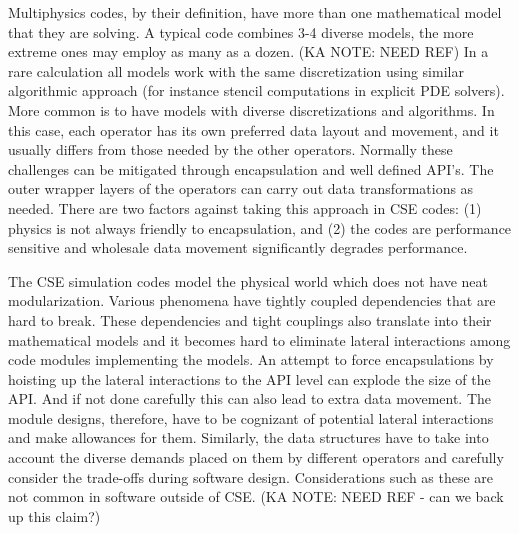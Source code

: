 \label{sec:domainChallenges}
Multiphysics codes, by their definition, have more than one
mathematical model that they are solving. A typical code combines 3-4
diverse models, the more extreme ones may employ as many as a
dozen. (KA NOTE: NEED REF)  In a rare calculation all models work with the same
discretization using similar algorithmic approach (for instance
stencil computations in explicit PDE solvers). More common is to have
models with diverse discretizations and algorithms. In this case, each operator has
its own preferred data layout and movement, and it usually differs
from those needed by the other operators.  Normally these challenges
can be mitigated through encapsulation and well defined API's. The outer
wrapper layers of the operators can carry out data transformations as
needed. There are two factors against taking this approach in CSE
codes: (1) physics is not always friendly to encapsulation, and (2)
the codes are performance sensitive and wholesale data movement
significantly degrades performance. 

The CSE simulation codes model the physical world which does not
have neat modularization. Various phenomena have tightly coupled
dependencies that are hard to break. These dependencies and tight
couplings also translate into their mathematical models and it becomes
hard to eliminate lateral interactions among code modules implementing
the models. An attempt to force encapsulations by hoisting up the
lateral interactions to the API level can explode the size of the
API. And if not done carefully this can also lead to extra data
movement. The module designs, therefore, have to be cognizant of
potential lateral interactions and make allowances for them.
Similarly, the data structures have to take into account the diverse
demands placed on them by different operators and carefully consider
the trade-offs during software design. Considerations such as these
are not common in software outside of CSE.  (KA NOTE: NEED REF - can we back up this claim?)


